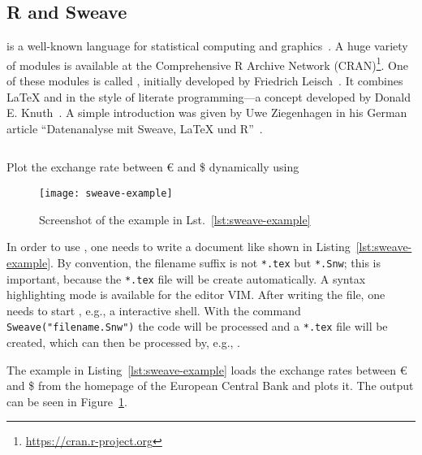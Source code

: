 \subsection{R and Sweave}

 is a well-known language for statistical computing and
graphics~\cite{Ihaka1998}.  A huge variety of modules is available at the
Comprehensive R Archive Network (CRAN)\footnote{%
  \href{https://cran.r-project.org}{https://cran.r-project.org}}.  One of these
modules is called , initially developed by Friedrich
Leisch~\cite{Leisch2002}.  It combines \LaTeX{} and  in the style of
literate programming—a concept developed by Donald E\@. Knuth~\cite{Knuth1992}.
A simple introduction was given by Uwe Ziegenhagen in his German article
\enquote{Datenanalyse mit Sweave, \LaTeX{} und R}~\cite{Ziegenhagen2010}.

\begin{listing}[H]
  \inputminted{latex}{../examples/sweave-example.Snw}
  \caption{Plot the exchange rate between \euro{} and \$ dynamically using
    }
  \label{lst:sweave-example}
\end{listing}

\begin{figure}[!t]
  \texttt{[image: sweave-example]}
  \caption{Screenshot of the  example in
    Lst.~\ref{lst:sweave-example}}
  \label{fig:sweave-example}
\end{figure}

In order to use , one needs to write a document like shown in
Listing~\ref{lst:sweave-example}.  By convention, the filename suffix is not
\texttt{*.tex} but \texttt{*.Snw}; this is important, because the \texttt{*.tex}
file will be create automatically.  A syntax highlighting mode is available for
the editor VIM\@.  After writing the file, one needs to start ,
e.g., a  interactive shell.  With the command
\texttt{Sweave("filename.Snw")} the  code will be processed
and a \texttt{*.tex} file will be created, which can then be processed by, e.g.,
.

The example in Listing~\ref{lst:sweave-example} loads the exchange rates between
\euro{} and \$ from the homepage of the European Central Bank and plots it. The
output can be seen in Figure~\ref{fig:sweave-example}.
